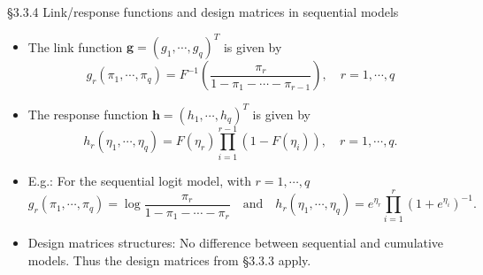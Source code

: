 \documentclass{beamer}
\begin{document}
\begin{frame}{\large \S3.3.4 Link/response functions and design matrices in sequential models}
\begin{itemize}

\item
The link function $\textbf{g}=(g_1,\cdots, g_q)^T$ is given by
$$g_r(\pi_1,\cdots,\pi_q)=F^{-1}\left(\frac{\pi_r}{1-\pi_1-\cdots -\pi_{r-1}}\right), \quad r=1,\cdots,q$$

\item The response function $\textbf{h}=(h_1,\cdots, h_q)^T$ is given by
$$h_r(\eta_1,\cdots, \eta_q)=F(\eta_r)\prod_{i=1}^{r-1}(1-F(\eta_i)), \quad r=1,\cdots,q.$$
\item
E.g.: For the sequential logit model, with $r=1,\cdots,q$ {\footnotesize
$$g_r(\pi_1,\cdots,\pi_q)=\log\frac{\pi_r}{1\!-\!\pi_1\!-\!\cdots \!-\!\pi_{r}}\quad \mbox{and}\quad
h_r(\eta_1,\cdots, \eta_q)=e^{\eta_r}\prod_{i=1}^{r}(1+e^{\eta_i})^{-1}.$$}

\item
Design matrices structures: No difference between sequential and cumulative models.
Thus the design matrices from \S3.3.3 apply.
\end{itemize}
\end{frame}
\end{document}
